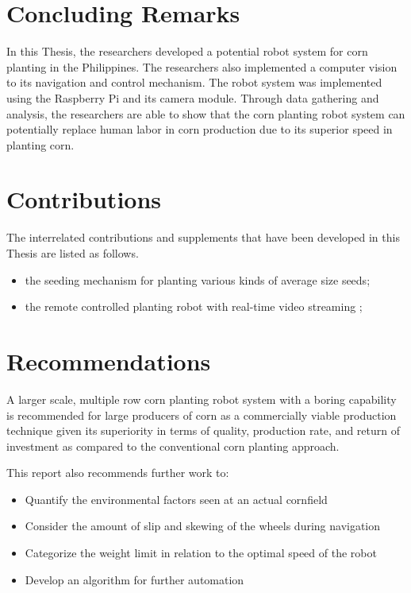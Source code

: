 \section{Concluding Remarks}

In this Thesis, the researchers developed a potential robot system for corn planting in the Philippines. The researchers also implemented a computer vision to its navigation and control mechanism. The robot system was implemented using the Raspberry Pi and its camera module. Through data gathering and analysis, the researchers are able to show that the corn planting robot system can potentially replace human labor in corn production due to its superior speed in planting corn. 

\section{Contributions}


The interrelated contributions and supplements that have been developed in this Thesis are listed as follows.

\begin{itemize}
  \item the seeding mechanism for planting various kinds of average size seeds; 
	
	\item the remote controlled planting robot with real-time video streaming ; 
	
\end{itemize}


\section{Recommendations}

A larger scale, multiple row corn planting robot system with a boring capability is recommended for large producers of corn as a commercially viable production technique given its superiority in terms of quality, production rate, and return of investment as compared to the conventional corn planting approach.

This report also recommends further work to:

\begin{itemize}
\item	Quantify the environmental factors seen at an actual cornfield
\item	Consider the amount of slip and skewing of the wheels during navigation
\item	Categorize the weight limit in relation to the optimal speed of the robot
\item	Develop an algorithm for further automation
\end{itemize}
